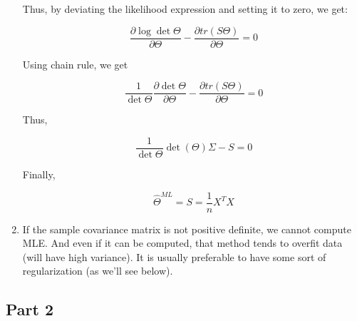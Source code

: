 \documentclass{article}
\begin{document}
\begin{enumerate}
Thus, by deviating the likelihood expression and setting it to zero, we get:

\begin{equation*}
\frac{\partial\log\det\Theta}{\partial \Theta} - \frac{\partial tr(S\Theta)}{\partial \Theta} = 0
\end{equation*}

Using chain rule, we get

\begin{equation*}
\frac{1}{\det\Theta}\frac{\partial\det\Theta}{\partial \Theta} - \frac{\partial tr(S\Theta)}{\partial \Theta} = 0
\end{equation*}

Thus,

\begin{equation*}
\frac{1}{\det\Theta}\det(\Theta)\Sigma - S = 0
\end{equation*}

Finally,

\begin{equation*}
\hat{\Theta}^{ML} = S = \frac{1}{n}X^TX
\end{equation*}

\item
If the sample covariance matrix is not positive definite, we cannot compute MLE. And even if it can be computed, that method tends to overfit data (will have high variance). It is usually preferable to have some sort of regularization (as we'll see below).

\end{enumerate}

\newpage
\subsection*{Part 2}
\end{document}
